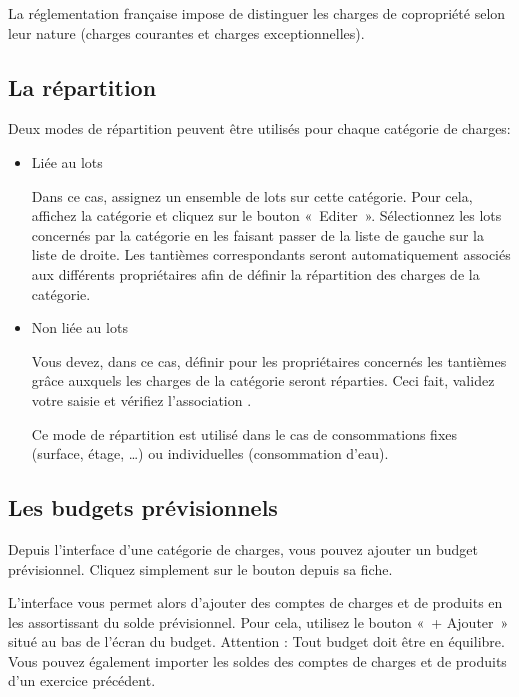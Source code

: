 \documentclass[a4paper,10pt,oneside,french]{sphinxmanual}
\begin{document}
\sphinxAtStartPar
La réglementation française impose de distinguer les charges de copropriété selon leur nature (charges courantes et charges exceptionnelles).


\subsection{La répartition}
\label{\detokenize{condominium/classloads:la-repartition}}
\sphinxAtStartPar
Deux modes de répartition peuvent être utilisés pour chaque catégorie de charges:
\begin{itemize}
\item {} 
\sphinxAtStartPar
Liée au lots

\sphinxAtStartPar
Dans ce cas, assignez un ensemble de lots sur cette catégorie. Pour cela, affichez la catégorie et cliquez sur le bouton « Editer ». Sélectionnez les lots concernés par la catégorie en les faisant passer de la liste de gauche sur la liste de droite.
Les tantièmes correspondants seront automatiquement associés aux différents propriétaires afin de définir la répartition des charges de la catégorie.

\item {} 
\sphinxAtStartPar
Non liée au lots

\sphinxAtStartPar
Vous devez, dans ce cas, définir pour les propriétaires concernés les tantièmes grâce auxquels les charges de la catégorie seront réparties.  Ceci fait, validez votre saisie et vérifiez l’association .

\sphinxAtStartPar
Ce mode de répartition est utilisé dans le cas de consommations fixes (surface, étage, …) ou individuelles (consommation d’eau).

\end{itemize}


\subsection{Les budgets prévisionnels}
\label{\detokenize{condominium/classloads:les-budgets-previsionnels}}
\sphinxAtStartPar
Depuis l’interface d’une catégorie de charges, vous pouvez ajouter un budget prévisionnel.
Cliquez simplement sur le bouton  depuis sa fiche.

\sphinxAtStartPar
L’interface vous permet alors d’ajouter des comptes de charges et de produits en les assortissant du solde prévisionnel. Pour cela, utilisez le bouton « + Ajouter » situé au bas de l’écran du budget. Attention : Tout budget doit être en équilibre.
Vous pouvez également importer les soldes des comptes de charges et de produits d’un exercice précédent.
\end{document}
